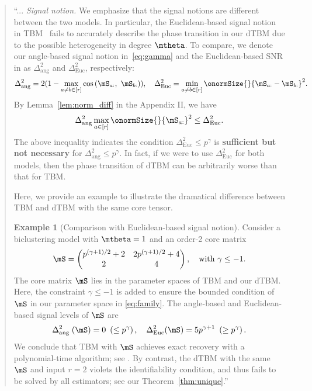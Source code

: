 \documentclass[11pt]{article}
\theoremstyle{definition}
\theoremstyle{definition}
\newtheorem{example}{Example}
\newcommand{\of}[1]{\left(#1\right)}
\begin{document}
\begin{enumerate}[wide, labelwidth=!, labelindent=0pt]
   \begin{quote}
   ``... \emph{Signal notion.} We emphasize that the signal notions are different between the two models. In particular, the Euclidean-based signal notion in TBM~\cite{han2020exact} fails to accurately describe the phase transition in our dTBM due to the possible heterogeneity in degree $\mtheta$. To compare, we denote our angle-based signal notion in~\eqref{eq:gamma} and the Euclidean-based SNR in \cite{han2020exact} as $\Delta_{\text{ang}}^2$ and $\Delta_{\text{Euc}}^2$, respectively:
\begin{equation}
     \Delta_{\text{ang}}^2 =  2(1 - \max_{a \neq b\in [r]}\cos \of{\mS_{a:},\  \mS_{b:}} ), \quad \Delta_{\text{Euc}}^2 = \min_{a \neq b \in [r]} \onormSize{}{\mS_{a:} - \mS_{b:}}^2.
\end{equation}
By Lemma~\ref{lem:norm_diff} in the Appendix II, we have 
\begin{equation}\label{eq:signalcompare}
     \Delta_{\text{ang}}^2  \max_{a \in [r]}\onormSize{}{\mS_{a:}}^2 \leq \Delta_{\text{Euc}}^2.
\end{equation}
The above inequality indicates the condition $\Delta_{\text{Euc}}^2 \leq p^{\gamma}$ is {\bf sufficient but not necessary} for $\Delta_{\text{ang}}^2 \leq p^{\gamma}$. In fact, if we were to use $\Delta_{\text{Euc}}^2$ for both models, then the phase transition of dTBM can be arbitrarily worse than that for TBM. 


Here, we provide an example to illustrate the dramatical difference between TBM and dTBM with the same core tensor.  

\begin{example}[Comparison with Euclidean-based signal notion] \label{example:euc_alg} Consider a biclustering model with $\mtheta=1$ and an order-2 core matrix 
\begin{equation}
    \mS = \begin{pmatrix} p^{(\gamma+1)/2 } + 2  & 2 p^{(\gamma+1)/2} + 4\\
    2 & 4
    \end{pmatrix},\quad \text{with}\ \gamma \leq -1.
\end{equation}
The core matrix $\mS$ lies in the parameter spaces of TBM and our dTBM. Here, the constraint $\gamma \leq -1$ is added to ensure the bounded condition of $\mS$ in our parameter space in \eqref{eq:family}. The angle-based and Euclidean-based signal levels of $\mS$ are 
\begin{equation}
    \Delta_{\text{ang }}^2(\mS) = 0 \ \left(\leq p^{\gamma}\right), \quad \Delta_{\text{Euc}}^2(\mS) = 5 p^{\gamma + 1} \ \left(\geq p^{\gamma}\right).
\end{equation}
We conclude that TBM with $\mS$ achieves exact recovery with a polynomial-time algorithm; see \citet[Theorem 4]{han2020exact}. By contrast, the dTBM with the same $\mS$ and input $r=2$ violets the identifiability condition, and thus fails to be solved by all estimators; see our Theorem~\ref{thm:unique}.'' 
\end{example}


\end{quote}
\end{enumerate}
\end{document}
